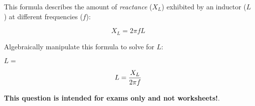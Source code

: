 

This formula describes the amount of {\it reactance} ($X_L$) exhibited by an inductor ($L$) at different frequencies ($f$):

$$X_L = 2 \pi f L$$

Algebraically manipulate this formula to solve for $L$:

\vskip 20pt

$L = $







$$L = {X_L \over {2 \pi f}}$$







{\bf This question is intended for exams only and not worksheets!}.



